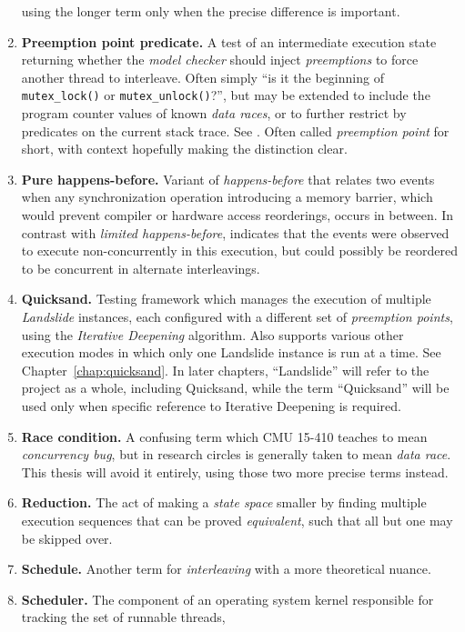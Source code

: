 \begin{enumerate}
		using the longer term only when the precise difference is important.
	\item {\bf Preemption point predicate.}
		A test of an intermediate execution state returning whether the {\em model checker}
		should inject {\em preemptions} to force another thread to interleave.
		Often simply ``is it the beginning of {\tt mutex\_lock()} or {\tt mutex\_unlock()}?'',
		but may be extended to include the program counter values of known {\em data races},
		or to further restrict by predicates on the current stack trace.
		See \sect{\ref{sec:landslide-pps}}.
		Often called {\em preemption point} for short, with context hopefully making the distinction clear.
	\item {\bf Pure happens-before.}
		Variant of {\em happens-before} that relates two events when any synchronization operation introducing a memory
		barrier, which would prevent compiler or hardware access reorderings, occurs in between.
		In contrast with {\em limited happens-before},
		indicates that the events were observed to execute non-concurrently in this execution,
		but could possibly be reordered to be concurrent in alternate interleavings.
	\item {\bf Quicksand.}
		Testing framework which manages the execution of multiple {\em Landslide} instances,
		each configured with a different set of {\em preemption points},
		using the {\em Iterative Deepening} algorithm.
		Also supports various other execution modes in which only one Landslide instance is run at a time.
		See Chapter~\ref{chap:quicksand}.
		In later chapters, ``Landslide'' will refer to the project as a whole, including Quicksand,
		while the term ``Quicksand'' will be used only when specific reference to Iterative Deepening is required.
	\item {\bf Race condition.}
		A confusing term which CMU 15-410 teaches to mean {\em concurrency bug},
		but in research circles is generally taken to mean {\em data race}.
		This thesis will avoid it entirely, using those two more precise terms instead.
	\item {\bf Reduction.}
		The act of making a {\em state space} smaller by finding multiple execution sequences
		that can be proved {\em equivalent},
		such that all but one may be skipped over.
	\item {\bf Schedule.}
		Another term for {\em interleaving} with a more theoretical nuance.
	\item {\bf Scheduler.}
		The component of an operating system kernel responsible for tracking the set of runnable threads,

\end{enumerate}
